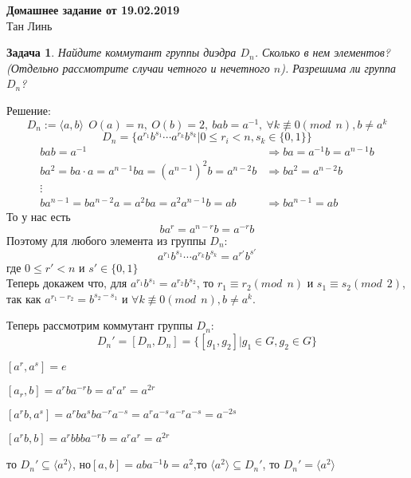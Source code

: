 \documentclass[a4paper,12pt]{article}
\theoremstyle{neosn}
\newtheorem{problem}{Задача}
\begin{document}
\begin{center}
    {\bf \Large Домашнее задание от 19.02.2019}\\
    Тан Линь
\end{center}

\begin{problem}
    Найдите коммутант группы диэдра $D_n$. Сколько в нем элементов?
    (Отдельно рассмотрите случаи четного и нечетного $n$). Разрешима ли группа $D_n$?
\end{problem}
Решение:\\
\[
    D_n := \langle a,b \rangle\ \ O(a)=n,\ O(b)=2,\ bab=a^{-1},\ \forall k \not \equiv 0(mod \ \ n),b \neq a^k
    \]
\[
    D_n=\{a^{r_1}b^{s_1}\cdots a^{r_k}b^{s_k}|0 \leqslant r_i < n,s_k \in \{0,1\} \}
    \]
\begin{align*}
    bab = a^{-1} &\Rightarrow ba = a^{-1}b = a^{n-1}b \\
    ba^2  =ba \cdot a = a^{n-1}ba = (a^{n-1})^2b=a^{n-2}b &\Rightarrow ba^2 = a^{n-2}b\\
    \vdots \\
    ba^{n-1}=ba^{n-2}a=a^2ba=a^2a^{n-1}b=ab &\Rightarrow ba^{n-1}=ab
\end{align*}
То   у нас есть 
$$
    ba^r=a^{n-r}b=a^{-r}b
$$
Поэтому для любого элемента из группы $D_n$:
\[
    a^{r_1}b^{s_1}\cdots a^{r_k}b^{s_k} = a^{r'}b^{s'}
    \]
где $0 \leqslant r' < n$ и $s' \in \{0,1\}$\\
Теперь докажем что, для $a^{r_1}b^{s_1}=a^{r_2}b^{s_2}$, то $r_1 \equiv r_2 (mod \ \ n)$ и $s_1 \equiv s_2 (mod\ \ 2)$, так 
как $a^{r_1 - r_2} = b^{s_2-s_1}$ и $\forall k \not \equiv 0(mod \ \ n),b \neq a^k$.

Теперь рассмотрим коммутант группы $D_n$:
\[
    D_n'=[D_n,D_n] = \{[g_1,g_2]|g_1 \in G,g_2 \in G\}
    \]
\begin{enumerate}
    \begin{item}
        $[a^r,a^s]=e$
    \end{item}
    \begin{item}
        $[a_r,b]=a^rba^{-r}b=a^ra^r=a^{2r}$
    \end{item}
    \begin{item}
        $[a^rb,a^s]=a^rba^sba^{-r}a^{-s}=a^ra^{-s}a^{-r}a^{-s}=a^{-2s}$
    \end{item}
    \begin{item}
        $[a^rb,b]=a^rbbba^{-r}b=a^ra^r=a^{2r}$
    \end{item}
\end{enumerate}
то $D_n' \subseteq \langle a^2 \rangle$, но$[a,b]=aba^{-1}b=a^2$,то $\langle a^2 \rangle \subseteq D_n'$, то $D_n'=\langle a^2 \rangle$
\end{document}
